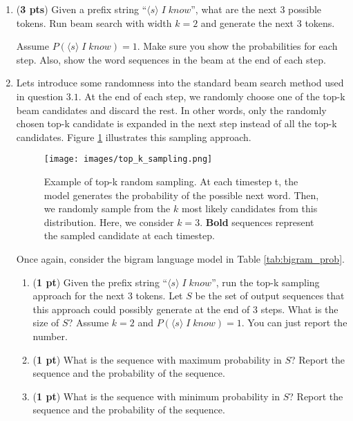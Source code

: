 \documentclass[11pt, letterpaper]{article}
\begin{document}
\begin{enumerate}
    \item (\textbf{3 pts}) Given a prefix string ``$\langle s\rangle\;I\;know$'', what are the next $3$ possible tokens. Run beam search with width $k=2$ and generate the next $3$ tokens. 
    
    Assume $P(\langle s  \rangle\;I\;know) = 1$. Make sure you show the probabilities for each step. Also, show the word sequences in the beam at the end of each step.
    
    \item Lets introduce some randomness into the standard beam search method used in question $3.1$. At the end of each step, we randomly choose one of the top-k beam candidates and discard the rest. In other words, only the randomly chosen top-k candidate is expanded in the next step instead of all the top-k candidates. Figure \ref{fig:top_k} illustrates this sampling approach.
    
    \begin{figure}[h!]
    \centering
    \texttt{[image: images/top\_k\_sampling.png]}
    \caption{Example of top-k random sampling. At each timestep t, the model generates the probability of the possible next word. Then, we randomly sample from the $k$ most likely candidates from this distribution. Here, we consider $k = 3$. \textbf{Bold} sequences represent the sampled candidate at each timestep.}
    \label{fig:top_k}
\end{figure}
    
    Once again, consider the bigram language model in Table \ref{tab:bigram_prob}.
    
    \begin{enumerate}
        \item (\textbf{1 pt}) Given the prefix string ``$\langle s\rangle\;I\;know$'', run the top-k sampling approach for the next 3 tokens.  Let $S$ be the set of output sequences that this approach could possibly generate at the end of 3 steps. What is the size of $S$? Assume $k = 2$ and $P(\langle s  \rangle\;I\;know) = 1$. You can just report the number.
        
        
        \item (\textbf{1 pt}) What is the sequence with maximum probability in $S$? Report the sequence and the probability of the sequence. 
        
        
        \item (\textbf{1 pt}) What is the sequence with  minimum probability in $S$? Report the sequence and the probability of the sequence.
        

\end{enumerate}
\end{enumerate}
\end{document}
